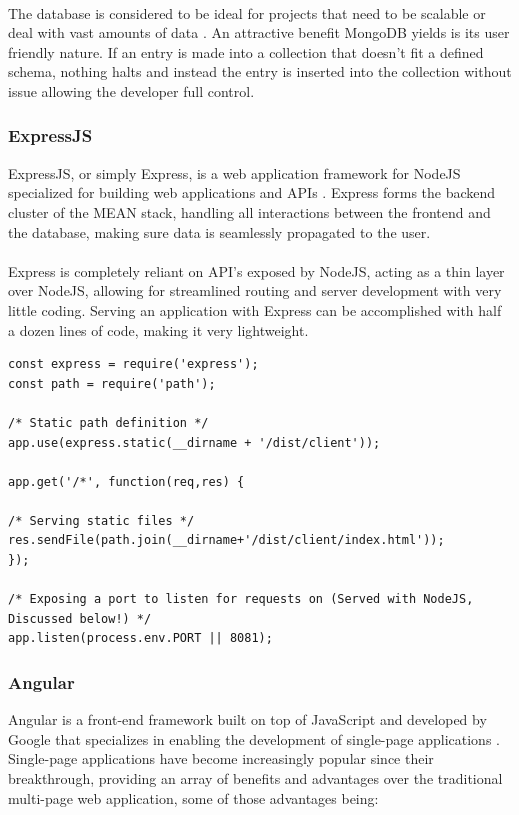\paragraph{}
The database is considered to be ideal for projects that need to be scalable or deal with vast amounts of data \cite{MONGODB}. An attractive benefit MongoDB yields is its user friendly nature. If an entry is made into a collection that doesn't fit a defined schema, nothing halts and instead the entry is inserted into the collection without issue allowing the developer full control.

\subsubsection{ExpressJS}
ExpressJS, or simply Express, is a web application framework for NodeJS specialized for building web applications and APIs \cite{EXPRESS}. Express forms the backend cluster of the MEAN stack, handling all interactions between the frontend and the database, making sure data is seamlessly propagated to the user. 

\paragraph{}
Express is completely reliant on API's exposed by NodeJS, acting as a thin layer over NodeJS, allowing for streamlined routing and server development with very little coding. Serving an application with Express can be accomplished with half a dozen lines of code, making it very lightweight.

\medskip
\begin{lstlisting}[caption=Serving with Express]
const express = require('express');
const path = require('path');

/* Static path definition */
app.use(express.static(__dirname + '/dist/client'));

app.get('/*', function(req,res) {

/* Serving static files */
res.sendFile(path.join(__dirname+'/dist/client/index.html'));
});

/* Exposing a port to listen for requests on (Served with NodeJS, Discussed below!) */
app.listen(process.env.PORT || 8081);

\end{lstlisting}

\subsubsection{Angular}
Angular is a front-end framework built on top of JavaScript and developed by Google that specializes in enabling the development of single-page applications \cite{ANGULAR}. Single-page applications have become increasingly popular since their breakthrough, providing an array of benefits and advantages over the traditional multi-page web application, some of those advantages being:


